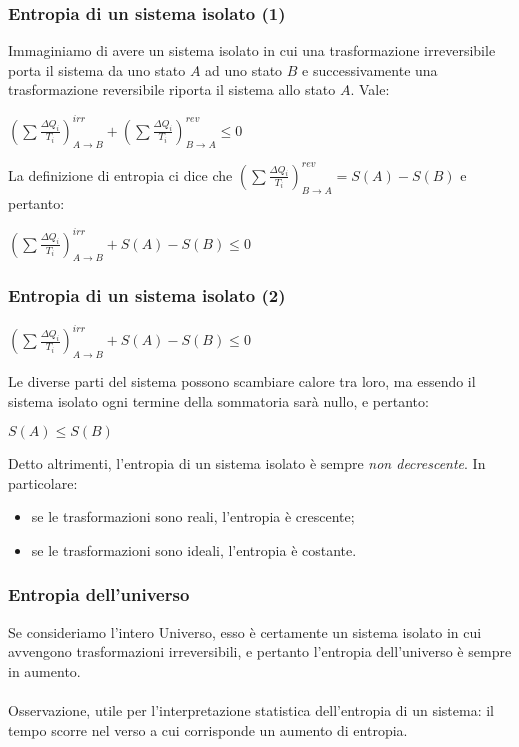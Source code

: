 \documentclass[]{beamer}
\theoremstyle{plain}
\begin{document}
\begin{frame}
\frametitle{Entropia di un sistema isolato (1)}
  Immaginiamo di avere un sistema isolato in cui una \alert{trasformazione irreversibile} porta il sistema da uno stato $ A $ ad uno stato $ B $ e successivamente una \alert{trasformazione reversibile} riporta il sistema allo stato $ A $.{\pause} Vale:
\begin{center}
$ \left( \sum\limits \frac{\Delta Q_i}{T_i}  \right)_{A \rightarrow B}^{irr} + \left( \sum\limits \frac{\Delta Q_i}{T_i}  \right)_{B \rightarrow A}^{rev} \leq 0  $
\end{center}
La definizione di entropia ci dice che $ \left( \sum\limits \frac{\Delta Q_i}{T_i}  \right)_{B \rightarrow A}^{rev} = S(A) - S(B) $ e pertanto:
\begin{center}
$ \left( \sum\limits \frac{\Delta Q_i}{T_i}  \right)_{A \rightarrow B}^{irr} + S(A) - S(B) \leq 0 $
\end{center}
\end{frame}



\begin{frame}
\frametitle{Entropia di un sistema isolato (2)}
\begin{center}
$ \left( \sum\limits \frac{\Delta Q_i}{T_i}  \right)_{A \rightarrow B}^{irr} + S(A) - S(B) \leq 0 $
\end{center}
Le diverse parti del sistema possono scambiare calore tra loro, ma essendo il sistema isolato ogni termine della sommatoria sarà nullo, e pertanto:\pause
\begin{center}
  \colorbox{blue!30}{$ S(A) \leq S(B) $}
\end{center}\pause
Detto altrimenti, l'entropia di un sistema isolato è sempre \emph{non decrescente}.{\pause} In particolare:
\begin{itemize}
  \item se le trasformazioni sono reali, l'entropia è crescente;
  \item se le trasformazioni sono ideali, l'entropia è costante.
\end{itemize}
\end{frame}





\begin{frame}
\frametitle{Entropia dell'universo}
Se consideriamo l'intero Universo, esso è certamente un sistema isolato in cui avvengono trasformazioni irreversibili, e pertanto l'entropia dell'universo è sempre in aumento.\pause
\\~\\
Osservazione, utile per l'interpretazione statistica dell'entropia di un sistema: il tempo scorre nel verso a cui corrisponde un aumento di entropia.
\end{frame}
\end{document}
